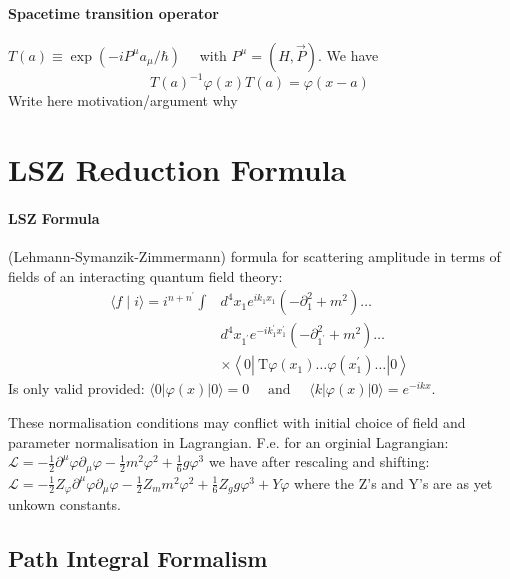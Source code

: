 \paragraph{Spacetime transition operator} $T(a) \equiv \exp \left(-i P^\mu a_\mu / \hbar\right) \quad$ with $P^\mu = (H,\vec{P})$. We have 
$$ T(a)^{-1} \varphi(x) T(a)=\varphi(x-a)$$
Write here motivation/argument why

\section{LSZ Reduction Formula}

\paragraph{LSZ Formula} (Lehmann-Symanzik-Zimmermann)  formula for scattering amplitude in terms of fields of an interacting quantum field theory: 
$$\begin{aligned}
  \langle f \mid i\rangle=i^{n+n^{\prime}} \int & d^4 x_1 e^{i k_1 x_1}\left(-\partial_1^2+m^2\right) \ldots \\
  & d^4 x_{1^{\prime}} e^{-i k_1^{\prime} x_1^{\prime}}\left(-\partial_{1^{\prime}}^2+m^2\right) \ldots \\
  & \times\left\langle 0\left|\mathrm{~T} \varphi\left(x_1\right) \ldots \varphi\left(x_1^{\prime}\right) \ldots\right| 0\right\rangle
  \end{aligned}$$
Is only valid provided: $\langle 0|\varphi(x)| 0\rangle=0 \quad \text { and } \quad\langle k|\varphi(x)| 0\rangle=e^{-i k x}$.\\

\begin{remark}
These normalisation conditions may conflict with initial choice of field and parameter normalisation in Lagrangian.
F.e. for an orginial Lagrangian: $\mathcal{L}=-\frac{1}{2} \partial^\mu \varphi \partial_\mu \varphi-\frac{1}{2} m^2 \varphi^2+\frac{1}{6} g \varphi^3$
we have after rescaling and shifting: $\mathcal{L}=-\frac{1}{2} Z_{\varphi} \partial^\mu \varphi \partial_\mu \varphi-\frac{1}{2} Z_m m^2 \varphi^2+\frac{1}{6} Z_g g \varphi^3+Y \varphi$
where the Z's and Y's are as yet unkown constants.
\end{remark}

\subsection{Path Integral Formalism}

